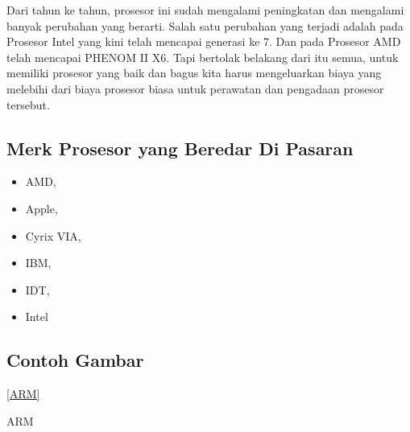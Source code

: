 Dari tahun ke tahun, prosesor ini sudah mengalami peningkatan dan mengalami banyak perubahan yang berarti. Salah satu perubahan yang 
terjadi adalah pada Prosesor Intel yang kini telah mencapai generasi ke 7. Dan pada Prosesor AMD telah mencapai PHENOM II X6. Tapi
bertolak belakang dari itu semua, untuk memiliki prosesor yang baik dan bagus kita harus mengeluarkan biaya yang melebihi dari biaya
prosesor biasa untuk perawatan dan pengadaan prosesor tersebut.

\subsection{Merk Prosesor yang Beredar Di Pasaran}
\begin{itemize}
	\item AMD,
	\item Apple,
	\item Cyrix VIA,
	\item IBM,
	\item IDT,
	\item Intel
\end{itemize}
\subsection{Contoh Gambar}

\ref{ARM}
\begin{Figure}[ht]
\caption{ARM}
\label{ARM}
\end{Figure}

